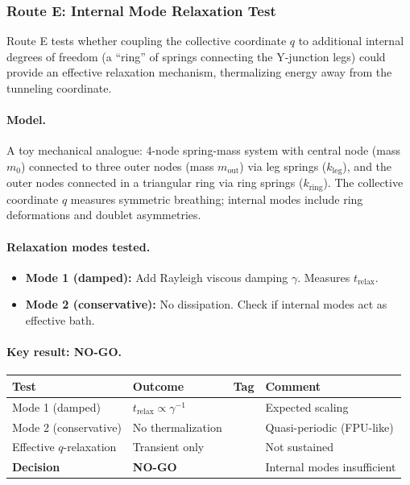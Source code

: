 
\subsubsection{Route E: Internal Mode Relaxation Test}
\label{subsec:routeE_relaxation}

Route E tests whether coupling the collective coordinate $q$ to additional internal
degrees of freedom (a ``ring'' of springs connecting the Y-junction legs) could provide
an effective relaxation mechanism, thermalizing energy away from the tunneling coordinate.

\paragraph{Model.}
A toy mechanical analogue: 4-node spring-mass system with central node (mass $m_0$) connected
to three outer nodes (mass $m_{\mathrm{out}}$) via leg springs ($k_{\mathrm{leg}}$), and the
outer nodes connected in a triangular ring via ring springs ($k_{\mathrm{ring}}$). The collective
coordinate $q$ measures symmetric breathing; internal modes include ring deformations and doublet
asymmetries.

\paragraph{Relaxation modes tested.}
\begin{itemize}[nosep]
  \item \textbf{Mode 1 (damped):} Add Rayleigh viscous damping $\gamma$. Measures $t_{\mathrm{relax}}$.
  \item \textbf{Mode 2 (conservative):} No dissipation. Check if internal modes act as effective bath.
\end{itemize}

\paragraph{Key result: NO-GO.}

\begin{center}
\begin{tabular}{lllp{4.5cm}}
\toprule
\textbf{Test} & \textbf{Outcome} & \textbf{Tag} & \textbf{Comment} \\
\midrule
Mode 1 (damped) & $t_{\mathrm{relax}} \propto \gamma^{-1}$ & \tagDc{} & Expected scaling \\
Mode 2 (conservative) & No thermalization & \tagDc{} & Quasi-periodic (FPU-like) \\
Effective $q$-relaxation & Transient only & \tagDc{} & Not sustained \\
\midrule
\textbf{Decision} & \textbf{NO-GO} & & Internal modes insufficient \\
\bottomrule
\end{tabular}
\end{center}

